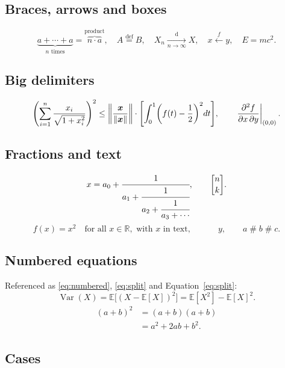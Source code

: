 \documentclass[11pt,letterpaper]{article}
\theoremstyle{definition}
\theoremstyle{remark}
\DeclareMathOperator{\Var}{Var}
\DeclarePairedDelimiter{\norm}{\lVert}{\rVert}
\newcommand{\E}{\mathbb{E}}
\newcommand{\R}{\mathbb{R}}
\begin{document}
\subsection{Braces, arrows and boxes}

\[ \underbrace{a + \cdots + a}_{n \text{ times}} = \overbrace{n \cdot a}^{\text{product}}, \quad A \overset{\text{def}}{=} B, \quad X_n \xrightarrow[n \to \infty]{\text{d}} X, \quad x \xleftarrow{f} y, \quad \boxed{E = mc^2}. \]

\subsection{Big delimiters}

\[ \left( \sum_{i=1}^n \frac{x_i}{\sqrt{1 + x_i^2}} \right)^2 \leq \left\lVert \frac{\bm x}{\norm{\bm x}} \right\rVert \cdot \Biggl[ \int_0^1 \biggl( f(t) - \frac{1}{2} \biggr)^2 dt \Biggr], \qquad \left. \frac{\partial^2 f}{\partial x\, \partial y} \right|_{(0,0)}. \]

\subsection{Fractions and text}

\[ x = a_0 + \cfrac{1}{a_1 + \cfrac{1}{a_2 + \cfrac{1}{a_3 + \dotsb}}}, \qquad \genfrac{[}{]}{0pt}{}{n}{k}. \]
\[ f(x) = x^2 \quad \text{for all } x \in \R, \text{ with $x$ in text}, \qquad \phantom{xx} y, \qquad a \mathbin{\#} b \mathrel{\#} c. \]

\subsection{Numbered equations}

Referenced as \eqref{eq:numbered}, \cref{eq:split} and Equation~\ref{eq:split}:
\begin{equation}\label{eq:numbered}
    \Var(X) = \E\bigl[(X - \E[X])^2\bigr] = \E[X^2] - \E[X]^2.
\end{equation}
\begin{equation}\label{eq:split}
\begin{split}
    (a + b)^2 &= (a + b)(a + b) \\
              &= a^2 + 2ab + b^2.
\end{split}
\end{equation}

\subsection{Cases}
\end{document}
